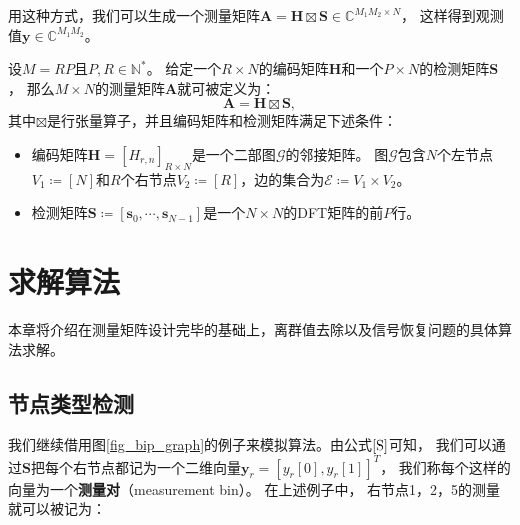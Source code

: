 \documentclass[AutoFakeBold]{LZUThesis}
\begin{document}
用这种方式，我们可以生成一个测量矩阵$\mathbf{A} = \mathbf{H} \boxtimes \mathbf{S} \in \mathbb{C}^{M_1 M_2 \times N}$，
这样得到观测值$\mathbf{y} \in \mathbb{C}^{M_1 M_2}$。
\begin{definition}[测量矩阵]
    设$M = RP$且$P, R \in \mathbb{N}^*$。
    给定一个$R \times N$的编码矩阵$\mathbf{H}$和一个$P \times N$的检测矩阵$\mathbf{S}$，
    那么$M \times N$的测量矩阵$\mathbf{A}$就可被定义为：
    \begin{equation}
        \mathbf{A} = \mathbf{H} \boxtimes \mathbf{S},
    \end{equation}
    其中$\boxtimes$是行张量算子，并且编码矩阵和检测矩阵满足下述条件：
    \begin{itemize}
        \item 编码矩阵$\mathbf{H} = [H_{r, n}]_{R \times N}$是一个二部图$\mathcal{G}$的邻接矩阵。
        图$\mathcal{G}$包含$N$个左节点$V_1 \coloneq [N]$和$R$个右节点$V_2 \coloneq [R]$，边的集合为$\mathcal{E} \coloneq V_1 \times V_2$。
        \item 检测矩阵$\mathbf{S} \coloneq \left[\mathbf{s}_0, \cdots, \mathbf{s}_{N-1}\right]$是一个$N \times N$的DFT矩阵的前$P$行。
    \end{itemize}
\end{definition}

\chapter{求解算法}
\label{3}
本章将介绍在测量矩阵设计完毕的基础上，离群值去除以及信号恢复问题的具体算法求解。

\section{节点类型检测}

我们继续借用图\ref{fig_bip_graph}的例子来模拟算法。由公式$\ref{S}$可知，
我们可以通过$\mathbf{S}$把每个右节点都记为一个二维向量$\mathbf{y}_r = [y_r[0], y_r[1]]^T$，
我们称每个这样的向量为一个\textbf{测量对}（measurement bin）。
在上述例子中，
右节点1，2，5的测量就可以被记为：
\end{document}
